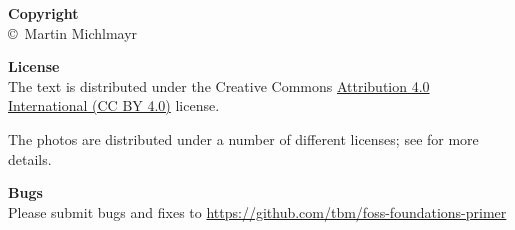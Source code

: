 \documentclass[
	a4paper,
	fontsize=12pt,
	twoside=false,
	numbers=noenddot,
]{kaobook}
\begin{document}






\appendix




\backmatter

\clearpage
\thispagestyle{empty}

\vspace*{.6\textheight}

\textbf{Copyright}\\
\copyright\ Martin Michlmayr

\medskip

\textbf{License}\\
The text is distributed under the Creative Commons \href{https://creativecommons.org/licenses/by/4.0/}{Attribution 4.0 International (CC BY 4.0)} license.

The photos are distributed under a number of different licenses; see  for more details.

\medskip

\textbf{Bugs}\\
Please submit bugs and fixes to \href{https://github.com/tbm/foss-foundations-primer/}{https://github.com/tbm/foss-foundations-primer}
\end{document}
